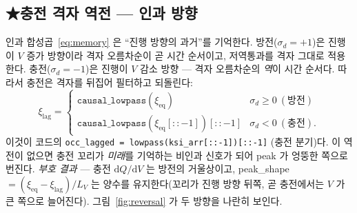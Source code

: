 \documentclass[11pt,a4paper]{article}
\newcommand{\dd}{\mathrm{d}}
\newcommand{\eq}{\mathrm{eq}}
\newcommand{\code}[1]{\texttt{#1}}
\begin{document}
\subsection{★충전 격자 역전 — 인과 방향}
인과 합성곱~\eqref{eq:memory} 은 ``진행 방향의 과거''를 기억한다. 방전($\sigma_d=+1$)은 진행이 $V$ 증가 방향이라 격자
오름차순이 곧 시간 순서이고, 저역통과를 격자 그대로 적용한다. 충전($\sigma_d=-1$)은 진행이 $V$ 감소 방향 — 격자
오름차순의 \emph{역}이 시간 순서다. 따라서 충전은 격자를 뒤집어 필터하고 되돌린다:
\begin{equation}
\xi_\mathrm{lag}=
\begin{cases}
\code{causal\_lowpass}(\xi_\eq) & \sigma_d\ge0\ (\text{방전})\\[2pt]
\code{causal\_lowpass}(\xi_\eq[::-1])[::-1] & \sigma_d<0\ (\text{충전}).
\end{cases}
\label{eq:reversal}
\end{equation}
이것이 코드의 \code{occ\_lagged = lowpass(ksi\_arr[::-1])[::-1]} (충전 분기)다. 이 역전이 없으면 충전 꼬리가
\emph{미래}를 기억하는 비인과 신호가 되어 peak 가 엉뚱한 쪽으로 번진다. \emph{부호 결과} — 충전 $\dd Q/\dd V$ 는 방전의
거울상이고, peak\_shape $=(\xi_\eq-\xi_\mathrm{lag})/L_V$ 는 양수를 유지한다(꼬리가 진행 방향 뒤쪽, 곧 충전에서는
$V$ 가 큰 쪽으로 늘어진다). 그림~\ref{fig:reversal} 가 두 방향을 나란히 보인다.
\end{document}
